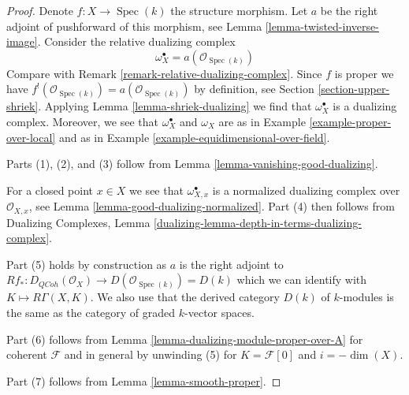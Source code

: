 \documentclass{stacks-project}
\theoremstyle{plain}
\theoremstyle{definition}
\theoremstyle{remark}
\numberwithin{equation}{subsection}
\def\Spec{\mathop{\mathrm{Spec}}}
\def\QCoh{\mathit{QCoh}}
\begin{document}
\begin{proof}
Denote $f : X \to \Spec(k)$ the structure morphism. Let $a$ be the
right adjoint of pushforward of this morphism, see
Lemma \ref{lemma-twisted-inverse-image}. Consider the relative dualizing
complex
$$
\omega_X^\bullet = a(\mathcal{O}_{\Spec(k)})
$$
Compare with Remark \ref{remark-relative-dualizing-complex}.
Since $f$ is proper we have
$f^!(\mathcal{O}_{\Spec(k)}) = a(\mathcal{O}_{\Spec(k)})$ by
definition, see Section \ref{section-upper-shriek}.
Applying Lemma \ref{lemma-shriek-dualizing} we find that
$\omega_X^\bullet$ is a dualizing complex. Moreover, we see that
$\omega_X^\bullet$ and $\omega_X$ are as in
Example \ref{example-proper-over-local} and as in
Example \ref{example-equidimensional-over-field}.

\medskip\noindent
Parts (1), (2), and (3) follow from
Lemma \ref{lemma-vanishing-good-dualizing}.

\medskip\noindent
For a closed point $x \in X$ we see that $\omega_{X, x}^\bullet$ is a
normalized dualizing complex over $\mathcal{O}_{X, x}$, see
Lemma \ref{lemma-good-dualizing-normalized}.
Part (4) then follows from Dualizing Complexes, Lemma
\ref{dualizing-lemma-depth-in-terms-dualizing-complex}.

\medskip\noindent
Part (5) holds by construction as $a$ is the right adjoint to
$Rf_* : D_\QCoh(\mathcal{O}_X) \to D(\mathcal{O}_{\Spec(k)}) = D(k)$
which we can identify with $K \mapsto R\Gamma(X, K)$. We also use
that the derived category $D(k)$ of $k$-modules is the same as the
category of graded $k$-vector spaces.

\medskip\noindent
Part (6) follows from Lemma \ref{lemma-dualizing-module-proper-over-A}
for coherent $\mathcal{F}$ and in general by unwinding
(5) for $K = \mathcal{F}[0]$ and $i = -\dim(X)$.

\medskip\noindent
Part (7) follows from Lemma \ref{lemma-smooth-proper}.
\end{proof}
\end{document}
